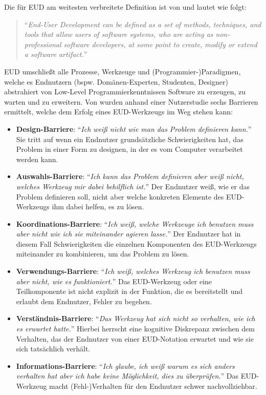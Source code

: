 Die für \ac{EUD} am weitesten verbreitete Definition ist von \cite{Lieberman.2006} und lautet wie folgt:

\begin{quote}
    "`\textit{End-User Development can be defined as a set of methods, techniques, and tools that allow users of software systems, who are acting as non-professional software developers, at some point to create, modify or extend a software artifact.}"'
\end{quote}

\ac{EUD} umschließt alle Prozesse, Werkzeuge und (Programmier-)Paradigmen, welche es Endnutzern (bspw. Domänen-Experten, Studenten, Designer) abstrahiert von Low-Level Programmierkenntnissen Software zu erzeugen, zu warten und zu erweitern. Von \cite{ko2004six} wurden anhand einer Nutzerstudie sechs Barrieren ermittelt, welche dem Erfolg eines \ac{EUD}-Werkzeugs im Weg stehen kann:
\begin{itemize}
    \item \textbf{Design-Barriere}: "`\textit{Ich weiß nicht wie man das Problem definieren kann.}"' Sie tritt auf wenn ein Endnutzer grundsätzliche Schwierigkeiten hat, das Problem in einer Form zu designen, in der es vom Computer verarbeitet werden kann.
    \item \textbf{Auswahls-Barriere}: "`\textit{Ich kann das Problem definieren aber weiß nicht, welches Werkzeug mir dabei behilflich ist.}"' Der Endnutzer weiß, wie er das Problem definieren soll, nicht aber welche konkreten Elemente des \ac{EUD}-Werkzeugs ihm dabei helfen, es zu lösen.
    \item \textbf{Koordinations-Barriere}: "`\textit{Ich weiß, welche Werkzeuge ich benutzen muss aber nicht wie ich sie miteinander agieren lasse.}"' Der Endnutzer hat in diesem Fall Schwierigkeiten die einzelnen Komponenten des \ac{EUD}-Werkzeugs miteinander zu kombinieren, um das Problem zu lösen. 
    \item \textbf{Verwendungs-Barriere}: "`\textit{Ich weiß, welches Werkzeug ich benutzen muss aber nicht, wie es funktioniert.}"' Das \ac{EUD}-Werkzeug oder eine Teilkomponente ist nicht explizit in der Funktion, die es bereitstellt und erlaubt dem Endnutzer, Fehler zu begehen. 
    \item \textbf{Verständnis-Barriere}: "`\textit{Das Werkzeug hat sich nicht so verhalten, wie ich es erwartet hatte.}"' Hierbei herrscht eine kognitive Diskrepanz zwischen dem Verhalten, das der Endnutzer von einer \ac{EUD}-Notation erwartet und wie sie sich tatsächlich verhält.
    \item \textbf{Informations-Barriere}: "`\textit{Ich glaube, ich weiß warum es sich anders verhalten hat aber ich habe keine Möglichkeit, dies zu überprüfen.}"'  Das \ac{EUD}-Werkzeug macht (Fehl-)Verhalten für den Endnutzer schwer nachvollziehbar.
\end{itemize}
